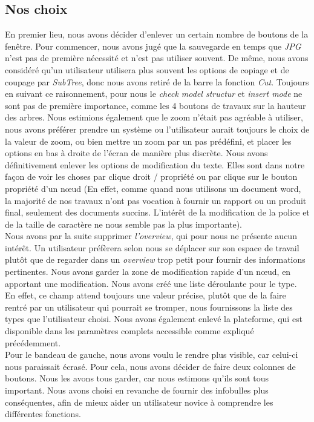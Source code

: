 \documentclass[12pt, a4paper]{article}
\begin{document}
\textcolor{NavyBlue}{\subsection{Nos choix}}

En premier lieu, nous avons décider d'enlever un certain nombre de boutons de la fenêtre. Pour commencer, nous avons jugé que la sauvegarde en temps que \emph{JPG} n'est pas de première nécessité et n'est pas utiliser souvent. De même, nous avons considéré qu'un utilisateur utilisera plus souvent les options de copiage et de coupage par \emph{SubTree}, donc nous avons retiré de la barre la fonction \emph{Cut}. Toujours en suivant ce raisonnement, pour nous le \emph{check model structur} et \emph{insert mode} ne sont pas de première importance, comme les 4 boutons de travaux sur la hauteur des arbres. Nous estimions également que le zoom n'était pas agréable à utiliser, nous avons préférer prendre un système ou l'utilisateur aurait toujours le choix de la valeur de zoom, ou bien mettre un zoom par un pas prédéfini, et placer les options en bas à droite de l'écran de manière plus discrète. Nous avons définitivement enlever les options de modification du texte. Elles sont dans notre façon de voir les choses par clique droit / propriété ou par clique sur le bouton propriété d'un nœud (En effet, comme quand nous utilisons un document word, la majorité de nos travaux n'ont pas vocation à fournir un rapport ou un produit final, seulement des documents succins. L’intérêt de la modification de la police et de la taille de caractère ne nous semble pas la plus importante).\\


Nous avons par la suite supprimer \emph{l'overview}, qui pour nous ne présente aucun intérêt. Un utilisateur préfèrera selon nous se déplacer sur son espace de travail plutôt que de regarder dans un \emph{overview} trop petit pour fournir des informations pertinentes. Nous avons garder la zone de modification rapide d'un nœud, en apportant une modification. Nous avons créé une liste déroulante pour le type. En effet, ce champ attend toujours une valeur précise, plutôt que de la faire rentré par un utilisateur qui pourrait se tromper, nous fournissons la liste des types que l'utilisateur choisi. Nous avons également enlevé la plateforme, qui est disponible dans les paramètres complets accessible comme expliqué précédemment.\\



Pour le bandeau de gauche, nous avons voulu le rendre plus visible, car celui-ci nous paraissait écrasé. Pour cela, nous avons décider de faire deux colonnes de boutons. Nous les avons tous garder, car nous estimons qu'ils sont tous important. Nous avons choisi en revanche de fournir des infobulles plus conséquentes, afin de mieux aider un utilisateur novice à comprendre les différentes fonctions.\\
\end{document}

